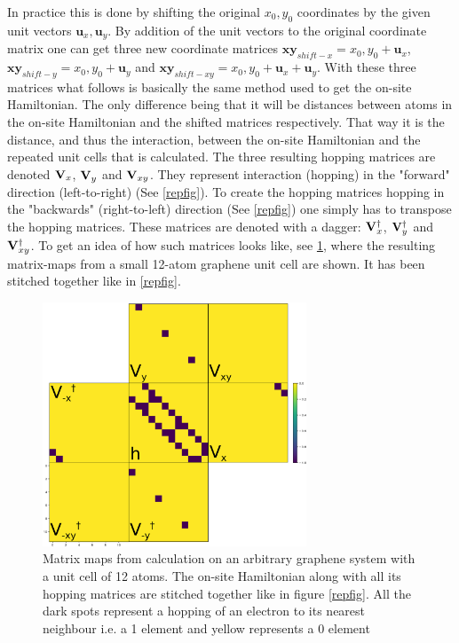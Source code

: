 In practice this is done by shifting the original \(x_0,y_0\) coordinates by the given unit vectors \(\mathbf{u}_x,\mathbf{u}_y\). By addition of the unit vectors to the original coordinate matrix one can get three new coordinate matrices \(\mathbf{xy}_{shift-x}=x_0,y_0 + \mathbf{u}_x\), \(\mathbf{xy}_{shift-y}=x_0,y_0 + \mathbf{u}_y\) and \(\mathbf{xy}_{shift-xy}=x_0,y_0 + \mathbf{u}_x+\mathbf{u}_y\). With these three matrices what follows is basically the same method used to get the on-site Hamiltonian. The only difference being that it will be distances between atoms in the on-site Hamiltonian and the shifted matrices respectively. That way it is the distance, and thus the interaction, between the on-site Hamiltonian and the repeated unit cells that is calculated. The three resulting hopping matrices are denoted \(\vb{V}_{x}\), \(\vb{V}_{y}\) and \(\vb{V}_{xy}\). They represent interaction (hopping) in the "forward" direction (left-to-right) (See \cref{repfig}). To create the hopping matrices hopping in the "backwards" (right-to-left) direction (See \cref{repfig}) one simply has to transpose the hopping matrices. These matrices are denoted with a dagger: \(\vb{V}_{x}^{\dagger}\), \(\vb{V}_{y}^{\dagger}\) and \(\vb{V}_{xy}^{\dagger}\). To get an idea of how such matrices looks like, see \cref{matrixmap}, where the resulting matrix-maps from a small 12-atom graphene unit cell are shown. It has been stitched together like in \cref{repfig}.
\begin{figure}[ht]
	\centering
	\includegraphics[width=0.7\textwidth]{Figures/stitch.eps}
	\caption{Matrix maps from calculation on an arbitrary graphene system with a unit cell of 12 atoms. The on-site Hamiltonian along with all its hopping matrices are stitched together like in figure \cref{repfig}. All the dark spots represent a hopping of an electron to its nearest neighbour i.e. a 1 element and yellow represents a 0 element}
	\label{matrixmap}
\end{figure}
